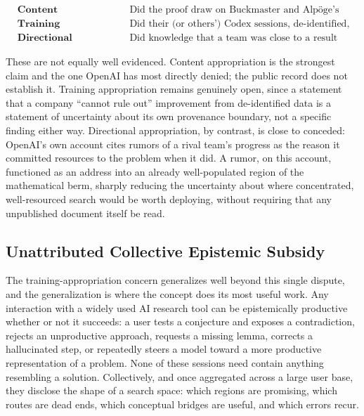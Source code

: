 \documentclass[11pt]{article}
\begin{document}
\[
\begin{aligned}
&\textbf{Content appropriation:}
&&\text{Did the proof draw on Buckmaster and Alp\"{o}ge's specific unpublished material?}\\
&\textbf{Training appropriation:}
&&\text{Did their (or others') Codex sessions, de-identified, shape the model that later competed with them?}\\
&\textbf{Directional appropriation:}
&&\text{Did knowledge that a team was close to a result change where OpenAI concentrated its search?}
\end{aligned}
\]

These are not equally well evidenced. Content appropriation is the strongest claim and the one OpenAI has most directly denied; the public record does not establish it. Training appropriation remains genuinely open, since a statement that a company ``cannot rule out'' improvement from de-identified data is a statement of uncertainty about its own provenance boundary, not a specific finding either way. Directional appropriation, by contrast, is close to conceded: OpenAI's own account cites rumors of a rival team's progress as the reason it committed resources to the problem when it did. A rumor, on this account, functioned as an address into an already well-populated region of the mathematical berm, sharply reducing the uncertainty about where concentrated, well-resourced search would be worth deploying, without requiring that any unpublished document itself be read.

\subsection{Unattributed Collective Epistemic Subsidy}

The training-appropriation concern generalizes well beyond this single dispute, and the generalization is where the concept does its most useful work. Any interaction with a widely used AI research tool can be epistemically productive whether or not it succeeds: a user tests a conjecture and exposes a contradiction, rejects an unproductive approach, requests a missing lemma, corrects a hallucinated step, or repeatedly steers a model toward a more productive representation of a problem. None of these sessions need contain anything resembling a solution. Collectively, and once aggregated across a large user base, they disclose the shape of a search space: which regions are promising, which routes are dead ends, which conceptual bridges are useful, and which errors recur.
\end{document}
